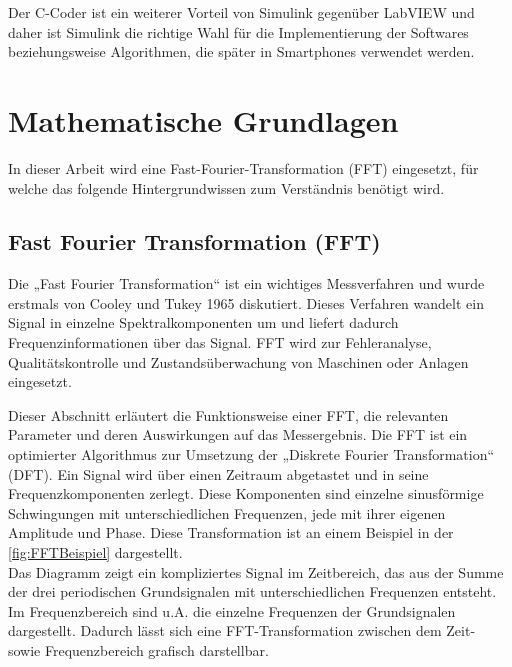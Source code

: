 Der C-Coder ist ein weiterer Vorteil von Simulink gegenüber LabVIEW und daher ist Simulink die richtige Wahl für die Implementierung der Softwares beziehungsweise Algorithmen, die später in Smartphones verwendet werden.






\section{Mathematische Grundlagen}

In dieser Arbeit wird eine Fast-Fourier-Transformation (FFT) eingesetzt, für welche das folgende Hintergrundwissen zum Verständnis benötigt wird.
\subsection{Fast Fourier Transformation (FFT)} \label{abs:FFT}

Die „Fast Fourier Transformation“ ist ein wichtiges Messverfahren und wurde erstmals von Cooley und Tukey 1965 diskutiert. Dieses Verfahren wandelt ein Signal in einzelne Spektralkomponenten um und liefert dadurch Frequenzinformationen über das Signal. FFT wird zur Fehleranalyse, Qualitätskontrolle und Zustandsüberwachung von Maschinen oder Anlagen eingesetzt. 

Dieser Abschnitt erläutert die Funktionsweise einer FFT, die relevanten Parameter und deren Auswirkungen auf das Messergebnis.
Die FFT ist ein optimierter Algorithmus zur Umsetzung der „Diskrete Fourier Transformation“ (DFT). Ein Signal wird über einen Zeitraum abgetastet und in seine Frequenzkomponenten zerlegt. Diese Komponenten sind einzelne sinusförmige Schwingungen mit unterschiedlichen Frequenzen, jede mit ihrer eigenen Amplitude und Phase. Diese Transformation ist an einem Beispiel in der \autoref{fig:FFTBeispiel} dargestellt.\\
Das Diagramm zeigt ein kompliziertes Signal im Zeitbereich, das aus der Summe der drei periodischen Grundsignalen mit unterschiedlichen Frequenzen entsteht. Im Frequenzbereich sind u.A. die einzelne Frequenzen der Grundsignalen dargestellt. Dadurch lässt sich eine FFT-Transformation zwischen dem Zeit- sowie Frequenzbereich grafisch darstellbar.

